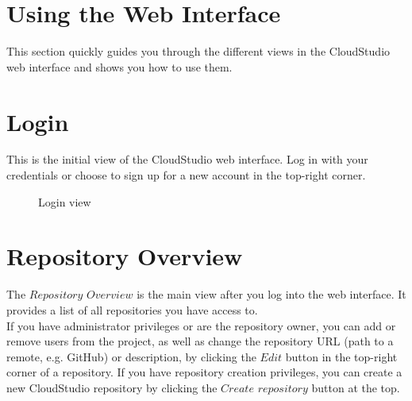 \section{Using the Web Interface}\label{webinterfaceguide}



This section quickly guides you through the different views in the CloudStudio web interface and shows you how to use them.


\section{Login}

This is the initial view of the CloudStudio web interface. Log in with your credentials or choose to sign up for a new account in the top-right corner.





\begin{figure}[h!]
  \centering
  \caption{Login view}
  \label{fig:login}
\end{figure}



\section{Repository Overview}

The $Repository$ $Overview$ is the main view after you log into the web interface. It provides a list of all repositories you have access to. \\

If you have administrator privileges or are the repository owner, you can add or remove users from the project, as well as change the repository URL (path to a remote, e.g. GitHub) or description, by clicking the $Edit$ button in the top-right corner of a repository. If you have repository creation privileges, you can create a new CloudStudio repository by clicking the $Create$ $repository$ button at the top. \\

